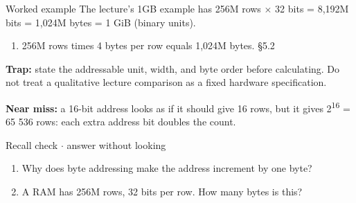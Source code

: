 \documentclass[11pt]{article}
\begin{document}
\begin{keepsection}
\begin{workedbox}{Worked example}
The lecture’s 1GB example has 256M rows \ensuremath{\times} 32 bits = 8,192M bits = 1,024M bytes = 1 GiB (binary units).

\begin{enumerate}
\item 256M rows times 4 bytes per row equals 1,024M bytes. \hfill{\small\color{FAUblue}§5.2}
\end{enumerate}
\end{workedbox}

\begin{notebox}\textbf{Trap:} state the addressable unit, width, and byte order before calculating. Do not treat a qualitative lecture comparison as a fixed hardware specification.\end{notebox}

\begin{notebox}\textbf{Near miss:} a 16-bit address looks as if it should give 16 rows, but it gives 2\textsuperscript{16} = 65 536 rows: each extra address bit doubles the count.\end{notebox}

\begin{recallbox}{Recall check \ensuremath{\cdot} answer without looking}
\begin{enumerate}
\item Why does byte addressing make the address increment by one byte?
\item A RAM has 256M rows, 32 bits per row. How many bytes is this?
\end{enumerate}

\end{recallbox}
\end{keepsection}
\end{document}

